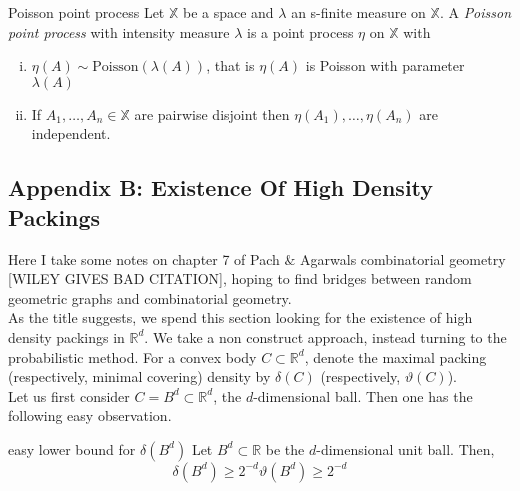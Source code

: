 \documentclass{article}
\begin{document}
\begin{definition}[]{Poisson point process}
    Let $\mathbb{X}$ be a space and $\lambda$ an s-finite measure on $\mathbb{X}$. A {\it Poisson point process} 
    with intensity measure $\lambda$ is a point process $\eta$ on $\mathbb{X}$ with
    \begin{enumerate}[(i)]
        \item $\eta(A) \sim \text{Poisson}(\lambda(A))$, that is $\eta(A)$ is Poisson with parameter $\lambda(A)$
        \item If $A_1, \dots, A_n \in \mathbb{X}$ are pairwise disjoint then $\eta(A_1), \dots, \eta(A_n)$ 
        are independent.
    \end{enumerate}
\end{definition}

\newpage

\subsection{Appendix B: Existence Of High Density Packings}

Here I take some notes on chapter 7 of Pach $\&$ Agarwals combinatorial geometry [WILEY GIVES BAD CITATION], 
hoping to find bridges between random geometric graphs and combinatorial geometry. \\ 

As the title suggests, we spend this section looking for the existence of high density packings in $\mathbb{R}^d$. 
We take a non construct approach, instead turning to the probabilistic method. For a convex body $C \subset \mathbb{R}^d$, 
denote the maximal packing (respectively, minimal covering) density by $\delta(C)$ (respectively, $\vartheta(C)$). \\

Let us first consider $C = B^d \subset \mathbb{R}^d$, the $d$-dimensional ball. Then one has the following easy 
observation. 

\begin{proposition}[]{easy lower bound for $\delta(B^d)$}
    Let $B^d \subset \mathbb{R}$ be the $d$-dimensional unit ball. Then, 
    \[\delta(B^d) \geq 2^{-d}\vartheta(B^d) \geq 2^{-d}\]
\end{proposition}
\end{document}
